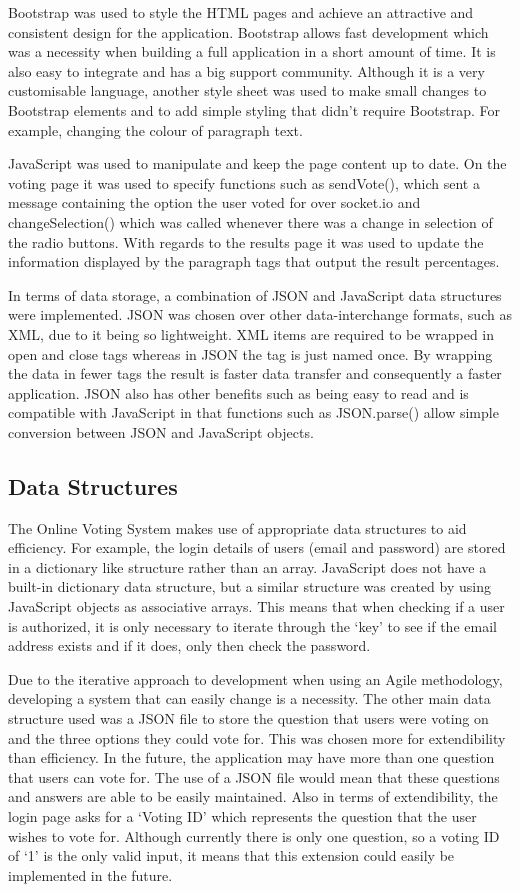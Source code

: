 \documentclass[11pt,oneside,a4paper]{article}
\begin{document}
Bootstrap was used to style the HTML pages and achieve an attractive and consistent design for the application. Bootstrap allows fast development which was a necessity when building a full application in a short amount of time. It is also easy to integrate and has a big support community. Although it is a very customisable language, another style sheet was used to make small changes to Bootstrap elements and to add simple styling that didn’t require Bootstrap. For example, changing the colour of paragraph text.

JavaScript was used to manipulate and keep the page content up to date. On the voting page it was used to specify functions such as sendVote(), which sent a message containing the option the user voted for over socket.io and changeSelection() which was called whenever there was a change in selection of the radio buttons. With regards to the results page it was used to update the information displayed by the paragraph tags that output the result percentages.

In terms of data storage, a combination of JSON and JavaScript data structures were implemented. JSON was chosen over other data-interchange formats, such as XML, due to it being so lightweight. XML items are required to be wrapped in open and close tags whereas in JSON the tag is just named once. By wrapping the data in fewer tags the result is faster data transfer and consequently a faster application. JSON also has other benefits such as being easy to read and is compatible with JavaScript in that functions such as JSON.parse() allow simple conversion between JSON and JavaScript objects.

\subsection*{Data Structures}
The Online Voting System makes use of appropriate data structures to aid efficiency. For example, the login details of users (email and password) are stored in a dictionary like structure rather than an array. JavaScript does not have a built-in dictionary data structure, but a similar structure was created by using JavaScript objects as associative arrays. This means that when checking if a user is authorized, it is only necessary to iterate through the ‘key’ to see if the email address exists and if it does, only then check the password. 

Due to the iterative approach to development when using an Agile methodology, developing a system that can easily change is a necessity. The other main data structure used was a JSON file to store the question that users were voting on and the three options they could vote for. This was chosen more for extendibility than efficiency. In the future, the application may have more than one question that users can vote for. The use of a JSON file would mean that these questions and answers are able to be easily maintained. Also in terms of extendibility, the login page asks for a ‘Voting ID’ which represents the question that the user wishes to vote for. Although currently there is only one question, so a voting ID of ‘1’ is the only valid input, it means that this extension could easily be implemented in the future.
\end{document}
